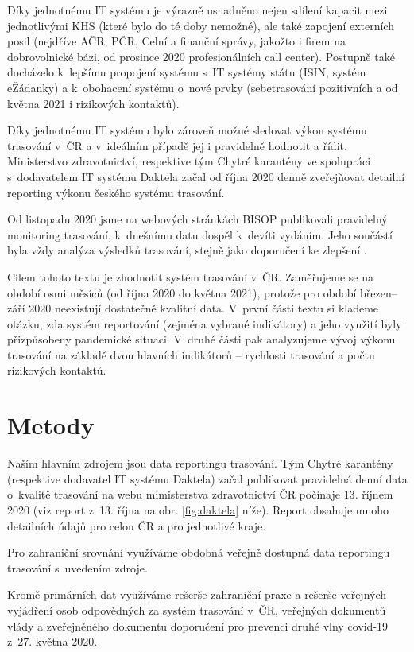 Díky jednotnému IT systému je výrazně usnadněno nejen sdílení kapacit mezi jednotlivými KHS (které bylo do té doby nemožné), ale také zapojení externích posil (nejdříve AČR, PČR, Celní a finanční správy, jakožto i firem na dobrovolnické bázi, od prosince 2020 profesionálních call center). Postupně také docházelo k~lepšímu propojení systému s~IT systémy státu (ISIN, systém eŽádanky) a k~obohacení systému o~nové prvky (sebetrasování pozitivních a od května 2021 i rizikových kontaktů).

Díky jednotnému IT systému bylo zároveň možné sledovat výkon systému trasování v~ČR a v~ideálním případě jej i pravidelně hodnotit a řídit. Ministerstvo zdravotnictví, respektive tým Chytré karantény ve spolupráci s~dodavatelem IT systému Daktela začal od října 2020 denně zveřejňovat detailní reporting výkonu českého systému trasování.

Od listopadu 2020 jsme na webových stránkách BISOP publikovali pravidelný monitoring trasování, k~dnešnímu datu dospěl k~devíti vydáním. Jeho součástí byla vždy analýza výsledků trasování, stejně jako doporučení ke zlepšení \cite{tr_bisop07}. 

Cílem tohoto textu je zhodnotit systém trasování v~ČR. Zaměřujeme se na období osmi měsíců (od října 2020 do května 2021), protože pro období březen--září 2020 neexistují dostatečně kvalitní data. V~první části textu si klademe otázku, zda systém reportování (zejména vybrané indikátory) a jeho využití byly přizpůsobeny pandemické situaci. V~druhé části pak analyzujeme vývoj výkonu trasování na základě dvou hlavních indikátorů -- rychlosti trasování a počtu rizikových kontaktů.

\section*{Metody}

Naším hlavním zdrojem jsou data reportingu trasování. Tým Chytré karantény (respektive dodavatel IT systému Daktela) začal publikovat pravidelná denní data o~kvalitě trasování na webu mimisterstva zdravotnictví ČR počínaje 13. říjnem 2020 (viz report z~13. října na obr. \ref{fig:daktela} níže). Report obsahuje mnoho detailních údajů pro celou ČR a pro jednotlivé kraje.

Pro zahraniční srovnání využíváme obdobná veřejně dostupná data reportingu trasování s~uvedením zdroje.

Kromě primárních dat využíváme rešerše zahraniční praxe a rešerše veřejných vyjádření osob odpovědných za systém trasování v~ČR, veřejných dokumentů vlády a zveřejněného dokumentu doporučení pro prevenci druhé vlny covid-19 z~27. května 2020.

